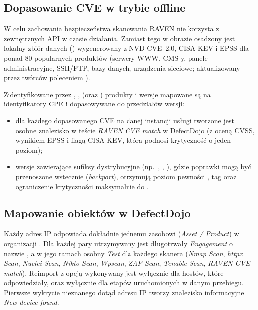 \documentclass[10pt,a4paper]{article}
\begin{document}

\subsection{Dopasowanie CVE w trybie offline}

W celu zachowania bezpieczeństwa skanowania RAVEN nie korzysta z zewnętrznych API w czasie działania. Zamiast tego w obrazie osadzony jest lokalny zbiór danych () wygenerowany z NVD CVE~2.0, CISA KEV i EPSS dla ponad 80 popularnych produktów (serwery WWW, CMS-y, panele administracyjne, SSH/FTP, bazy danych, urządzenia sieciowe; aktualizowany przez twórców poleceniem ).

Zidentyfikowane przez , ,  (oraz ) produkty i wersje mapowane są na identyfikatory CPE i dopasowywane do przedziałów wersji:
\begin{itemize}
  \item dla każdego dopasowanego CVE na danej instancji usługi tworzone jest osobne znalezisko w teście \emph{RAVEN CVE match} w DefectDojo (z oceną CVSS, wynikiem EPSS i flagą CISA KEV, która podnosi krytyczność o jeden poziom);
  \item wersje zawierające sufiksy dystrybucyjne (np.~, , ), gdzie poprawki mogą być przenoszone wstecznie (\emph{backport}), otrzymują poziom pewności , tag  oraz ograniczenie krytyczności maksymalnie do .
\end{itemize}

\subsection{Mapowanie obiektów w DefectDojo}

Każdy adres IP odpowiada dokładnie jednemu zasobowi (\emph{Asset / Product}) w organizacji . Dla każdej pary  utrzymywany jest długotrwały \emph{Engagement} o nazwie , a w jego ramach osobny \emph{Test} dla każdego skanera (\emph{Nmap Scan}, \emph{httpx Scan}, \emph{Nuclei Scan}, \emph{Nikto Scan}, \emph{Wpscan}, \emph{ZAP Scan}, \emph{Tenable Scan}, \emph{RAVEN CVE match}). Reimport z opcją  wykonywany jest wyłącznie dla hostów, które odpowiedziały, oraz wyłącznie dla etapów uruchomionych w danym przebiegu. Pierwsze wykrycie nieznanego dotąd adresu IP tworzy znalezisko informacyjne \emph{New device found}.
\end{document}
